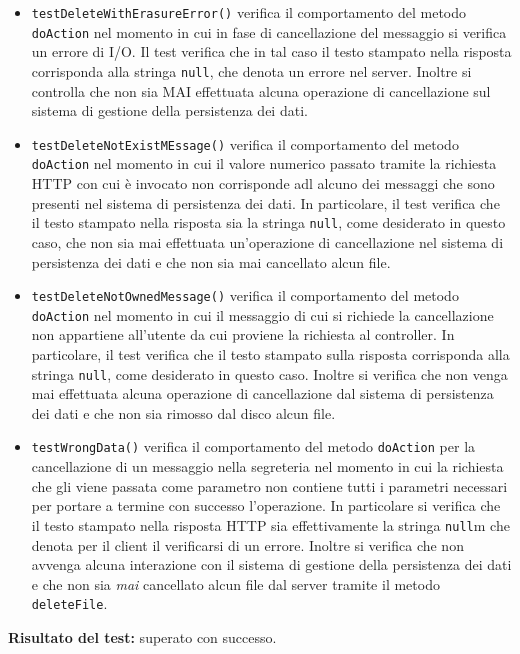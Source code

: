 \begin{itemize}
\begin{itemize}
\item \texttt{testDeleteWithErasureError()} verifica il comportamento del metodo \texttt{doAction} nel momento in cui in fase di cancellazione del messaggio si verifica un errore di I/O. Il test verifica che in tal caso il testo stampato nella risposta corrisponda alla stringa \texttt{null}, che denota un errore nel server. Inoltre si controlla che non sia MAI effettuata alcuna operazione di cancellazione sul sistema di gestione della persistenza dei dati.

\item \texttt{testDeleteNotExistMEssage()} verifica il comportamento del metodo \texttt{doAction} nel momento in cui il valore numerico passato tramite la richiesta HTTP con cui è invocato non corrisponde adl alcuno dei messaggi che sono presenti nel sistema di persistenza dei dati. In particolare, il test verifica che il testo stampato nella risposta sia la stringa \texttt{null}, come desiderato in questo caso, che non sia mai effettuata un'operazione di cancellazione nel sistema di persistenza dei dati e che non sia mai cancellato alcun file.

\item \texttt{testDeleteNotOwnedMessage()} verifica il comportamento del metodo \texttt{doAction} nel momento in cui il messaggio di cui si richiede la cancellazione non appartiene all'utente da cui proviene la richiesta al controller. In particolare, il test verifica che il testo stampato sulla risposta corrisponda alla stringa \texttt{null}, come desiderato in questo caso. Inoltre si verifica che non venga mai effettuata alcuna operazione di cancellazione dal sistema di persistenza dei dati e che non sia rimosso dal disco alcun file.

\item \texttt{testWrongData()} verifica il comportamento del metodo \texttt{doAction} per la cancellazione di un messaggio nella segreteria nel momento in cui la richiesta che gli viene passata come parametro non contiene tutti i parametri necessari per portare a termine con successo l'operazione. In particolare si verifica che il testo stampato nella risposta HTTP sia effettivamente la stringa \texttt{null}m che denota per il client il verificarsi di un errore. Inoltre si verifica che non avvenga alcuna interazione con il sistema di gestione della persistenza dei dati e che non sia \textit{mai} cancellato alcun file dal server tramite il metodo \texttt{deleteFile}.

\end{itemize}
\textbf{Risultato del test:} superato con successo.


\end{itemize}
